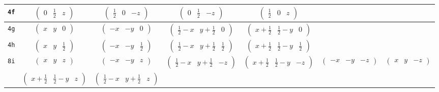 \documentclass[fleqn,9pt,landscape]{jsarticle}
\begin{document}
\begin{center}
\begin{longtable}{ccccccc}
{\tt 4f} & $ \begin{pmatrix} 0 & \frac{1}{2} & z \end{pmatrix} $ & $ \begin{pmatrix} \frac{1}{2} & 0 & - z \end{pmatrix} $ & $ \begin{pmatrix} 0 & \frac{1}{2} & - z \end{pmatrix} $ & $ \begin{pmatrix} \frac{1}{2} & 0 & z \end{pmatrix} $ & $  $ & $  $ \\ \hline
{\tt 4g} & $ \begin{pmatrix} x & y & 0 \end{pmatrix} $ & $ \begin{pmatrix} - x & - y & 0 \end{pmatrix} $ & $ \begin{pmatrix} \frac{1}{2} - x & y + \frac{1}{2} & 0 \end{pmatrix} $ & $ \begin{pmatrix} x + \frac{1}{2} & \frac{1}{2} - y & 0 \end{pmatrix} $ & $  $ & $  $ \\ \hline
{\tt 4h} & $ \begin{pmatrix} x & y & \frac{1}{2} \end{pmatrix} $ & $ \begin{pmatrix} - x & - y & \frac{1}{2} \end{pmatrix} $ & $ \begin{pmatrix} \frac{1}{2} - x & y + \frac{1}{2} & \frac{1}{2} \end{pmatrix} $ & $ \begin{pmatrix} x + \frac{1}{2} & \frac{1}{2} - y & \frac{1}{2} \end{pmatrix} $ & $  $ & $  $ \\ \hline
{\tt 8i} & $ \begin{pmatrix} x & y & z \end{pmatrix} $ & $ \begin{pmatrix} - x & - y & z \end{pmatrix} $ & $ \begin{pmatrix} \frac{1}{2} - x & y + \frac{1}{2} & - z \end{pmatrix} $ & $ \begin{pmatrix} x + \frac{1}{2} & \frac{1}{2} - y & - z \end{pmatrix} $ & $ \begin{pmatrix} - x & - y & - z \end{pmatrix} $ & $ \begin{pmatrix} x & y & - z \end{pmatrix} $ \\
& $ \begin{pmatrix} x + \frac{1}{2} & \frac{1}{2} - y & z \end{pmatrix} $ & $ \begin{pmatrix} \frac{1}{2} - x & y + \frac{1}{2} & z \end{pmatrix} $ & $  $ & $  $ & $  $ & $  $ \\
\end{longtable}
\end{center}
\end{document}
